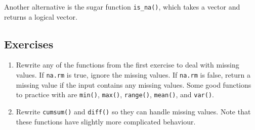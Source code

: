 \begin{Shaded}
\begin{Highlighting}[]
\NormalTok{(}\NormalTok{(}\NormalTok{, }\NormalTok{, }\NormalTok{, }\NormalTok{))}
\end{Highlighting}
\end{Shaded}

Another alternative is the sugar function \texttt{is\_na()}, which takes
a vector and returns a logical vector.

\begin{Shaded}
\begin{Highlighting}[]
  

   
\NormalTok{\}}
\end{Highlighting}
\end{Shaded}

\begin{Shaded}
\begin{Highlighting}[]
\NormalTok{(}\NormalTok{(}\NormalTok{, }\NormalTok{, }\NormalTok{, }\NormalTok{))}
\end{Highlighting}
\end{Shaded}

\subsection{Exercises}

\begin{enumerate}
\def\labelenumi{\arabic{enumi}.}
\item
  Rewrite any of the functions from the first exercise to deal with
  missing values. If \texttt{na.rm} is true, ignore the missing values.
  If \texttt{na.rm} is false, return a missing value if the input
  contains any missing values. Some good functions to practice with are
  \texttt{min()}, \texttt{max()}, \texttt{range()}, \texttt{mean()}, and
  \texttt{var()}.
\item
  Rewrite \texttt{cumsum()} and \texttt{diff()} so they can handle
  missing values. Note that these functions have slightly more
  complicated behaviour.
\end{enumerate}

